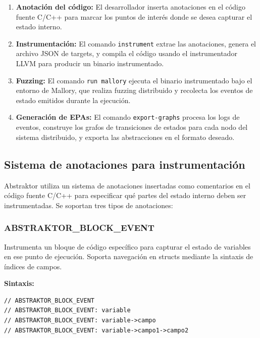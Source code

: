 \documentclass[12pt]{article}
\begin{document}
\begin{enumerate}
    \item \textbf{Anotación del código:} El desarrollador inserta anotaciones en el código fuente C/C++ para marcar los puntos de interés donde se desea capturar el estado interno.
    
    \item \textbf{Instrumentación:} El comando \texttt{instrument} extrae las anotaciones, genera el archivo JSON de targets, y compila el código usando el instrumentador LLVM para producir un binario instrumentado.
    
    \item \textbf{Fuzzing:} El comando \texttt{run mallory} ejecuta el binario instrumentado bajo el entorno de Mallory, que realiza fuzzing distribuido y recolecta los eventos de estado emitidos durante la ejecución.
    
    \item \textbf{Generación de EPAs:} El comando \texttt{export-graphs} procesa los logs de eventos, construye los grafos de transiciones de estados para cada nodo del sistema distribuido, y exporta las abstracciones en el formato deseado.
\end{enumerate}

\subsection{Sistema de anotaciones para instrumentación}

Abstraktor utiliza un sistema de anotaciones insertadas como comentarios en el código fuente C/C++ para especificar qué partes del estado interno deben ser instrumentadas. Se soportan tres tipos de anotaciones:

\subsubsection{ABSTRAKTOR\_BLOCK\_EVENT}

Instrumenta un bloque de código específico para capturar el estado de variables en ese punto de ejecución. Soporta navegación en structs mediante la sintaxis de índices de campos.

\textbf{Sintaxis:}
\begin{verbatim}
// ABSTRAKTOR_BLOCK_EVENT
// ABSTRAKTOR_BLOCK_EVENT: variable
// ABSTRAKTOR_BLOCK_EVENT: variable->campo
// ABSTRAKTOR_BLOCK_EVENT: variable->campo1->campo2
\end{verbatim}
\end{document}
